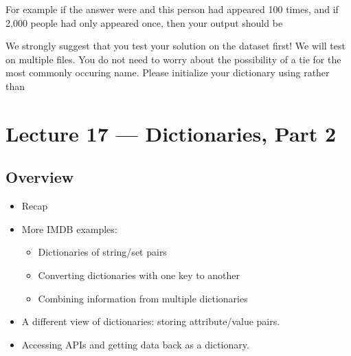 \documentclass[letterpaper,10pt,english]{sphinxmanual}
\begin{document}
\begin{enumerate}
For example if the answer were  and this
person had appeared 100 times, and if 2,000 people had only
appeared once, then your output should be

%
\begin{sphinxVerbatim}[commandchars=\\\{\}]
        
      
   
\end{sphinxVerbatim}

We strongly suggest that you test your solution on the
 dataset first!  We will test on multiple files.  You
do not need to worry about the possibility of a tie for the most
commonly occuring name.  Please initialize your dictionary using
 rather than \sphinxcode{\sphinxupquote{\{\}}}

\end{enumerate}


\chapter{Lecture 17 — Dictionaries, Part 2}
\label{\detokenize{lecture_notes/lec17_dictionaries2:lecture-17-dictionaries-part-2}}\label{\detokenize{lecture_notes/lec17_dictionaries2::doc}}

\section{Overview}
\label{\detokenize{lecture_notes/lec17_dictionaries2:overview}}\begin{itemize}
\item {} 
Recap

\item {} 
More IMDB examples:
\begin{itemize}
\item {} 
Dictionaries of string/set pairs

\item {} 
Converting dictionaries with one key to another

\item {} 
Combining information from multiple dictionaries

\end{itemize}

\item {} 
A different view of dictionaries: storing attribute/value pairs.

\item {} 
Accessing APIs and getting data back as a dictionary.

\end{itemize}
\end{document}
